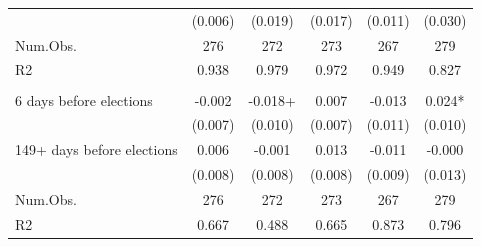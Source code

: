 \begin{tabular}[t]{lccccc}
\hspace{1em} & (0.006) & (0.019) & (0.017) & (0.011) & (0.030)\\
\hspace{1em}Num.Obs. & 276 & 272 & 273 & 267 & \vphantom{1} 279\\
\hspace{1em}R2 & 0.938 & 0.979 & 0.972 & 0.949 & 0.827\\
\addlinespace[0.5cm]
\multicolumn{6}{l}{Panel D: Turnout}\\
\hspace{1em}6 days before elections & -0.002 & -0.018+ & 0.007 & -0.013 & 0.024*\\
\hspace{1em} & (0.007) & (0.010) & (0.007) & (0.011) & (0.010)\\
\hspace{1em}149+ days before elections & 0.006 & -0.001 & 0.013 & -0.011 & -0.000\\
\hspace{1em} & (0.008) & (0.008) & (0.008) & (0.009) & (0.013)\\
\hspace{1em}Num.Obs. & 276 & 272 & 273 & 267 & 279\\
\hspace{1em}R2 & 0.667 & 0.488 & 0.665 & 0.873 & 0.796\\
\bottomrule
\end{tabular}
